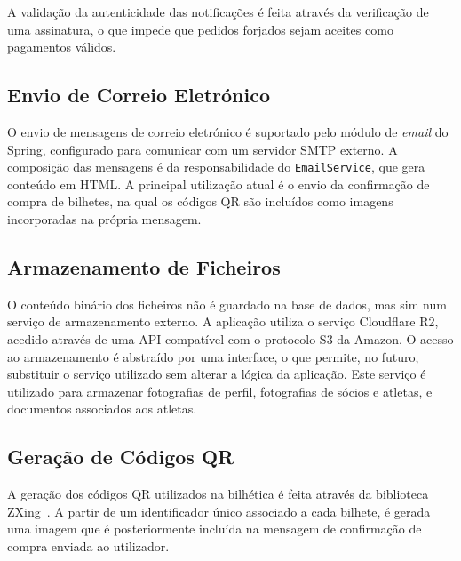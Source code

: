 A validação da autenticidade das notificações é feita através da verificação de 
uma assinatura, o que impede que pedidos forjados sejam aceites como 
pagamentos válidos.

\subsection{Envio de Correio Eletrónico}

O envio de mensagens de correio eletrónico é suportado pelo módulo de 
\textit{email} do Spring, configurado para comunicar com um servidor SMTP 
externo. A composição das mensagens é da responsabilidade do 
\texttt{EmailService}, que gera conteúdo em HTML. A principal utilização atual 
é o envio da confirmação de compra de bilhetes, na qual os códigos QR são 
incluídos como imagens incorporadas na própria mensagem.

\subsection{Armazenamento de Ficheiros}

O conteúdo binário dos ficheiros não é guardado na base de dados, mas sim num serviço de armazenamento 
externo. A aplicação utiliza o serviço Cloudflare R2, acedido através de uma 
API compatível com o protocolo S3 da Amazon. O acesso ao armazenamento é 
abstraído por uma interface, o que permite, no futuro, substituir o serviço 
utilizado sem alterar a lógica da aplicação. Este serviço é utilizado para 
armazenar fotografias de perfil, fotografias de sócios e atletas, e documentos 
associados aos atletas.

\subsection{Geração de Códigos QR}

A geração dos códigos QR utilizados na bilhética é feita através da biblioteca 
ZXing~\cite{zxing}. A partir de um identificador único associado a cada 
bilhete, é gerada uma imagem que é posteriormente incluída na mensagem de 
confirmação de compra enviada ao utilizador.